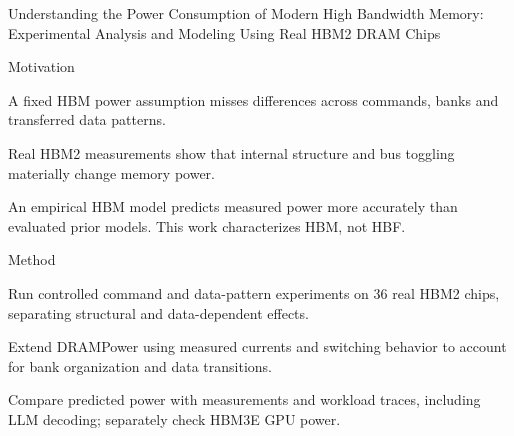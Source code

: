 \begin{frame}[t]{Understanding the Power Consumption of Modern High Bandwidth Memory:\\Experimental Analysis and Modeling Using Real HBM2 DRAM Chips}
\vspace{.02cm}
\begin{minipage}[t][3.25cm][t]{\linewidth}
\begin{summarysection}{Motivation}
\item {} A fixed HBM power assumption misses differences across commands, banks and transferred data patterns.
\item {} Real HBM2 measurements show that internal structure and bus toggling materially change memory power.
\item {} An empirical HBM model predicts measured power more accurately than evaluated prior models. This work characterizes HBM, not HBF.
\end{summarysection}
\end{minipage}
\vspace{.18cm}
\begin{summarysection}{Method}
\item {} Run controlled command and data-pattern experiments on 36 real HBM2 chips, separating structural and data-dependent effects.
\item {} Extend DRAMPower using measured currents and switching behavior to account for bank organization and data transitions.
\item {} Compare predicted power with measurements and workload traces, including LLM decoding; separately check HBM3E GPU power.
\end{summarysection}
\end{frame}
\endgroup
